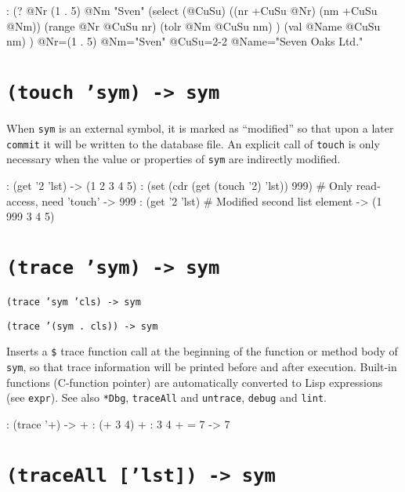 {\begin{wideverbatim}
: (?
   @Nr (1 . 5)
   @Nm "Sven"
   (select (@CuSu)
      ((nr +CuSu @Nr) (nm +CuSu @Nm))
      (range @Nr @CuSu nr)
      (tolr @Nm @CuSu nm) )
   (val @Name @CuSu nm) )
 @Nr=(1 . 5) @Nm="Sven" @CuSu={2-2} @Name="Seven Oaks Ltd."
\end{wideverbatim}

 
\section*{\texttt{(touch 'sym) -> sym}}
\label{sec:func-ref-T-(touch 'sym) -> sym}


When \texttt{sym} is an external symbol, it is marked as ``modified'' so that
upon a later \texttt{commit} it will be written to the database file. An
explicit call of \texttt{touch} is only necessary when the value or properties
of \texttt{sym} are indirectly modified.


\begin{wideverbatim}
: (get '{2} 'lst)
-> (1 2 3 4 5)
: (set (cdr (get (touch '{2}) 'lst)) 999)    # Only read-access, need 'touch'
-> 999
: (get '{2} 'lst)                            # Modified second list element
-> (1 999 3 4 5)
\end{wideverbatim}

 
\section*{\texttt{(trace 'sym) -> sym}}
\label{sec:func-ref-T-(trace 'sym) -> sym}


\texttt{(trace 'sym 'cls) -> sym}

\texttt{(trace '(sym . cls)) -> sym}

Inserts a \texttt{\$} trace function call at the beginning of the function or
method body of \texttt{sym}, so that trace information will be printed before
and after execution. Built-in functions (C-function pointer) are
automatically converted to Lisp expressions (see \texttt{expr}). See also
\texttt{*Dbg}, \texttt{traceAll} and \texttt{untrace}, \texttt{debug} and \texttt{lint}.


\begin{wideverbatim}
: (trace '+)
-> +
: (+ 3 4)
 + : 3 4
 + = 7
-> 7
\end{wideverbatim}

 
\section*{\texttt{(traceAll ['lst]) -> sym}}
\label{sec:func-ref-T-(traceAll ['lst]) -> sym}


}
